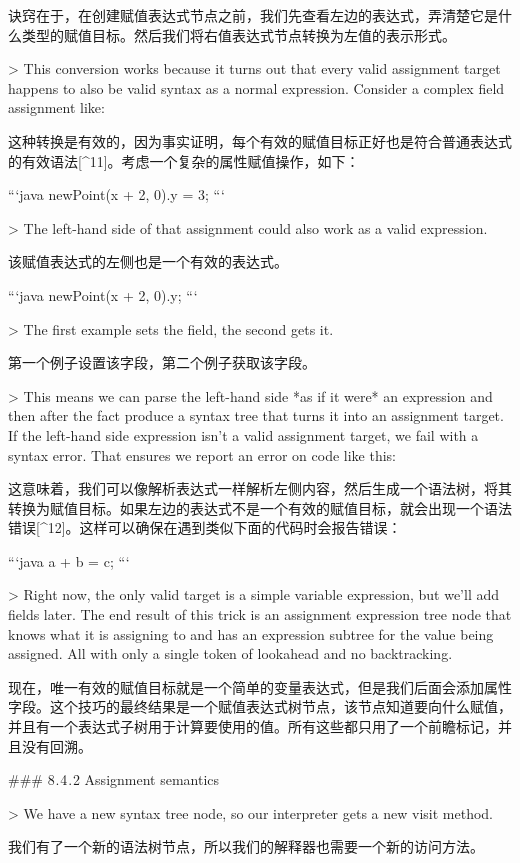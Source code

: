 \documentclass[cn,11pt,chinese]{elegantbook}
\begin{document}
{{{{{{{诀窍在于，在创建赋值表达式节点之前，我们先查看左边的表达式，弄清楚它是什么类型的赋值目标。然后我们将右值表达式节点转换为左值的表示形式。

> This conversion works because it turns out that every valid assignment target happens to also be valid syntax as a normal expression. Consider a complex field assignment like:

这种转换是有效的，因为事实证明，每个有效的赋值目标正好也是符合普通表达式的有效语法[^11]。考虑一个复杂的属性赋值操作，如下：

```java
newPoint(x + 2, 0).y = 3;
```

> The left-hand side of that assignment could also work as a valid expression.

该赋值表达式的左侧也是一个有效的表达式。

```java
newPoint(x + 2, 0).y;
```

> The first example sets the field, the second gets it.

第一个例子设置该字段，第二个例子获取该字段。

> This means we can parse the left-hand side *as if it were* an expression and then after the fact produce a syntax tree that turns it into an assignment target. If the left-hand side expression isn’t a valid assignment target, we fail with a syntax error. That ensures we report an error on code like this:

这意味着，我们可以像解析表达式一样解析左侧内容，然后生成一个语法树，将其转换为赋值目标。如果左边的表达式不是一个有效的赋值目标，就会出现一个语法错误[^12]。这样可以确保在遇到类似下面的代码时会报告错误：

```java
a + b = c;
```

> Right now, the only valid target is a simple variable expression, but we’ll add fields later. The end result of this trick is an assignment expression tree node that knows what it is assigning to and has an expression subtree for the value being assigned. All with only a single token of lookahead and no backtracking.

现在，唯一有效的赋值目标就是一个简单的变量表达式，但是我们后面会添加属性字段。这个技巧的最终结果是一个赋值表达式树节点，该节点知道要向什么赋值，并且有一个表达式子树用于计算要使用的值。所有这些都只用了一个前瞻标记，并且没有回溯。

### 8 . 4 . 2 Assignment semantics

> We have a new syntax tree node, so our interpreter gets a new visit method.

我们有了一个新的语法树节点，所以我们的解释器也需要一个新的访问方法。

}}}}}}}
\end{document}
